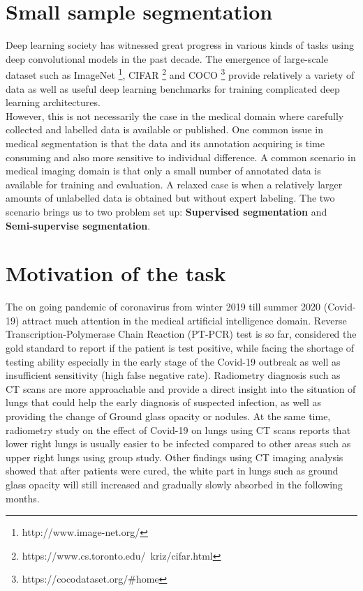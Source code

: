 \section{Small sample segmentation}
Deep learning society has witnessed great progress in various kinds of tasks using deep convolutional models in the past decade. The emergence of large-scale dataset such as ImageNet \footnote{http://www.image-net.org/}, CIFAR \footnote{https://www.cs.toronto.edu/~kriz/cifar.html} and COCO \footnote{https://cocodataset.org/\#home} provide relatively a variety of data as well as useful deep learning benchmarks for training complicated deep learning architectures.\\

However, this is not necessarily the case in the medical domain where carefully collected and labelled data is available or published. One common issue in medical segmentation is that the data and its annotation acquiring is time consuming and also more sensitive to individual difference. A common scenario in medical imaging domain is that only a small number of annotated data is available for training and evaluation. A relaxed case is when a relatively larger amounts of unlabelled data is obtained but without expert labeling. The two scenario brings us to two problem set up: \textbf{Supervised segmentation} and \textbf{Semi-supervise segmentation}.

\section{Motivation of the task}
The on going pandemic of coronavirus from winter 2019 till summer 2020 (Covid-19) attract much attention in the medical artificial intelligence domain. Reverse Transcription-Polymerase Chain Reaction (PT-PCR) test is so far, considered the gold standard to report if the patient is test positive, while facing the shortage of testing ability especially in the early stage of the Covid-19 outbreak as well as insufficient sensitivity (high false negative rate). Radiometry diagnosis such as CT scans are more approachable and provide a direct insight into the situation of lungs that could help the early diagnosis of suspected infection, as well as providing the change of Ground glass opacity or nodules. At the same time, radiometry study on the effect of Covid-19 on lungs using CT scans reports that lower right lungs is usually easier to be infected compared to other areas such as upper right lungs using group study. Other findings using CT imaging analysis  showed that after patients were cured, the white part in lungs such as ground glass opacity will still increased and gradually slowly absorbed in the following months.\\

